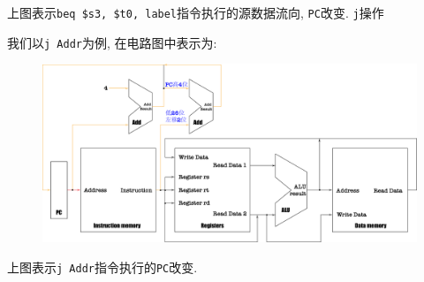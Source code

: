 \begin{enumerate}
\begin{figure}[H]
\end{figure}
上图表示\verb|beq $s3, $t0, label|指令执行的\textcolor{myred}{源数据流向}, \textcolor{myyellow}{\texttt{PC}改变}.
\texttt{j}操作 \par
我们以\verb|j Addr|为例, 在电路图中表示为:
\begin{figure}[H]
\centering
\includegraphics[scale=.3]{img/figure30.pdf}
\end{figure}
上图表示\verb|j Addr|指令执行的\textcolor{myyellow}{\texttt{PC}改变}.
\end{enumerate}
